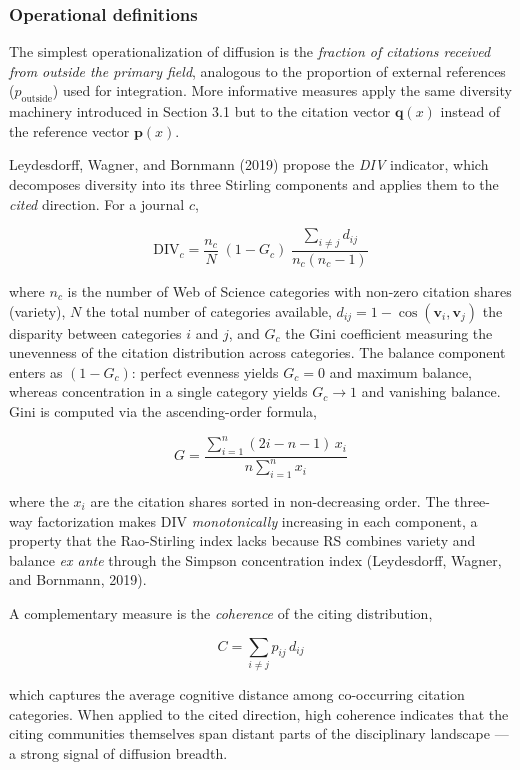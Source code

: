 \documentclass[
]{article}
\begin{document}
\hypertarget{operational-definitions}{%
\subsubsection{Operational definitions}\label{operational-definitions}}

The simplest operationalization of diffusion is the \emph{fraction of
citations received from outside the primary field}, analogous to the
proportion of external references (\(p_{\text{outside}}\)) used for
integration. More informative measures apply the same diversity
machinery introduced in Section 3.1 but to the citation vector
\(\mathbf{q}(x)\) instead of the reference vector \(\mathbf{p}(x)\).

Leydesdorff, Wagner, and Bornmann (2019) propose the \emph{DIV}
indicator, which decomposes diversity into its three Stirling components
and applies them to the \emph{cited} direction. For a journal \(c\),

\[\text{DIV}_c = \frac{n_c}{N}\;(1 - G_c)\;
  \frac{\displaystyle\sum_{i \neq j} d_{ij}}{n_c(n_c - 1)}\]

where \(n_c\) is the number of Web of Science categories with non-zero
citation shares (variety), \(N\) the total number of categories
available, \(d_{ij} = 1 - \cos(\mathbf{v}_i, \mathbf{v}_j)\) the
disparity between categories \(i\) and \(j\), and \(G_c\) the Gini
coefficient measuring the unevenness of the citation distribution across
categories. The balance component enters as \((1 - G_c)\): perfect
evenness yields \(G_c = 0\) and maximum balance, whereas concentration
in a single category yields \(G_c \to 1\) and vanishing balance. Gini is
computed via the ascending-order formula,

\[G = \frac{\displaystyle\sum_{i=1}^{n}(2i - n - 1)\,x_i}
          {n\displaystyle\sum_{i=1}^{n} x_i}\]

where the \(x_i\) are the citation shares sorted in non-decreasing
order. The three-way factorization makes DIV \emph{monotonically}
increasing in each component, a property that the Rao-Stirling index
lacks because RS combines variety and balance \emph{ex ante} through the
Simpson concentration index (Leydesdorff, Wagner, and Bornmann, 2019).

A complementary measure is the \emph{coherence} of the citing
distribution,

\[C = \sum_{i \neq j} p_{ij}\,d_{ij}\]

which captures the average cognitive distance among co-occurring
citation categories. When applied to the cited direction, high coherence
indicates that the citing communities themselves span distant parts of
the disciplinary landscape --- a strong signal of diffusion breadth.
\end{document}
